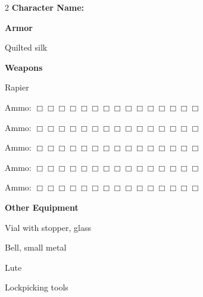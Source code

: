 \documentclass[10pt]{article}
\begin{document}
\begin{multicols}{2}
\textbf{Character Name:} \hrulefill

\vspace{24pt}

\textbf{Armor}


Quilted silk




\hrulefill


\hrulefill


\hrulefill



\vspace{24pt}

\textbf{Weapons}


Rapier




\hrulefill

Ammo: $\Box \Box \Box \Box \Box \Box \Box \Box \Box \Box \Box \Box \Box \Box \Box$ 


\hrulefill

Ammo: $\Box \Box \Box \Box \Box \Box \Box \Box \Box \Box \Box \Box \Box \Box \Box$ 


\hrulefill

Ammo: $\Box \Box \Box \Box \Box \Box \Box \Box \Box \Box \Box \Box \Box \Box \Box$ 


\hrulefill

Ammo: $\Box \Box \Box \Box \Box \Box \Box \Box \Box \Box \Box \Box \Box \Box \Box$ 


\hrulefill

Ammo: $\Box \Box \Box \Box \Box \Box \Box \Box \Box \Box \Box \Box \Box \Box \Box$ 



\vspace{24pt}

\textbf{Other Equipment}


Vial with stopper, glass


Bell, small metal


Lute


Lockpicking tools




\hrulefill


\hrulefill


\hrulefill


\hrulefill


\hrulefill


\hrulefill


\hrulefill


\hrulefill



\end{multicols}
\end{document}
